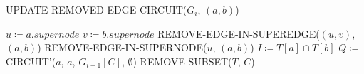 \begin{algorithm}[H]
    \caption{UPDATE-REMOVED-EDGE-CIRCUIT($G_i$, $(a, b)$)}\label{alg:remove-edge-circuit}
    \begin{algorithmic}[1]
        \State $u \coloneqq a.supernode$
        \State $v \coloneqq b.supernode$
            \State REMOVE-EDGE-IN-SUPEREDGE($(u, v)$, $(a, b)$)
        \Else
            \State REMOVE-EDGE-IN-SUPERNODE($u$, $(a, b)$)
        \EndIf
        \State $I \coloneqq T[a] \cap T[b]$
            \State $Q \coloneqq $ CIRCUIT'($a$, $a$, $G_{i-1}[C]$, $\emptyset$)
                \State REMOVE-SUBSET($T$, $C$)
            \EndIf
        \EndFor
    \end{algorithmic}
\end{algorithm}